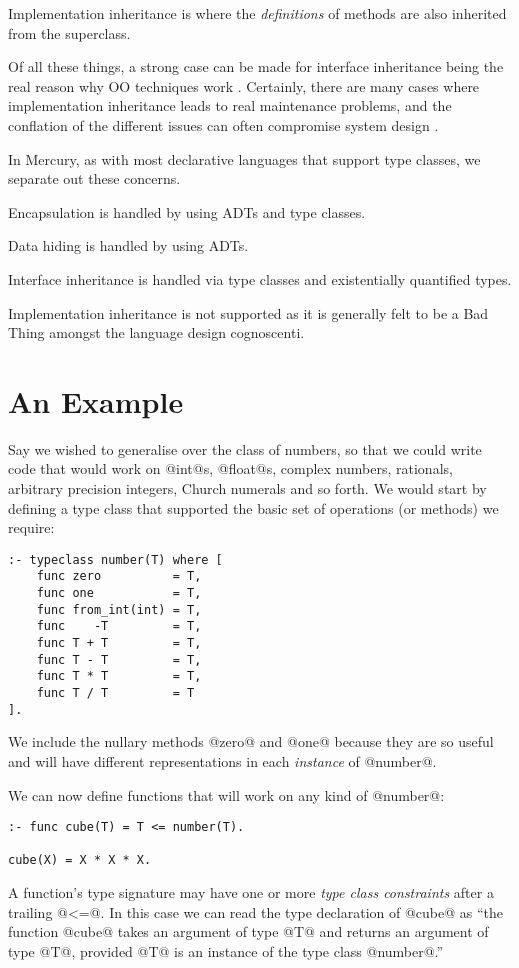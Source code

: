 Implementation inheritance is where the \emph{definitions} of methods
are also inherited from the superclass.

Of all these things, a strong case can be made for interface inheritance
being the real reason why OO techniques work .
Certainly, there are many cases where implementation inheritance leads
to real maintenance problems, and the conflation of the different issues
can often compromise system design .

In Mercury, as with most declarative languages that support type
classes, we separate out these concerns.

Encapsulation is handled by using ADTs and type classes.

Data hiding is handled by using ADTs.

Interface inheritance is handled via type classes and existentially
quantified types.

Implementation inheritance is not supported as it is generally felt to
be a Bad Thing amongst the language design cognoscenti.

\section{An Example}

Say we wished to generalise over the class of numbers, so that we could
write code that would work on @int@s, @float@s, complex numbers,
rationals, arbitrary precision integers, Church numerals and so forth.
We would start by defining a type class that supported the basic set of
operations (or methods) we require:
\begin{verbatim}
:- typeclass number(T) where [
    func zero          = T,
    func one           = T,
    func from_int(int) = T,
    func    -T         = T,
    func T + T         = T,
    func T - T         = T,
    func T * T         = T,
    func T / T         = T
].
\end{verbatim}
We include the nullary methods @zero@ and @one@ because they are so
useful and will have different representations in each \emph{instance}
of @number@.

We can now define functions that will work on any kind of @number@:
\begin{verbatim}
:- func cube(T) = T <= number(T).

cube(X) = X * X * X.
\end{verbatim}
A function's type signature may have one or more \emph{type class
constraints} after a trailing @<=@.  In this case we can read the type
declaration of @cube@ as ``the function @cube@ takes an argument of type
@T@ and returns an argument of type @T@, provided @T@ is an instance of
the type class @number@.''

